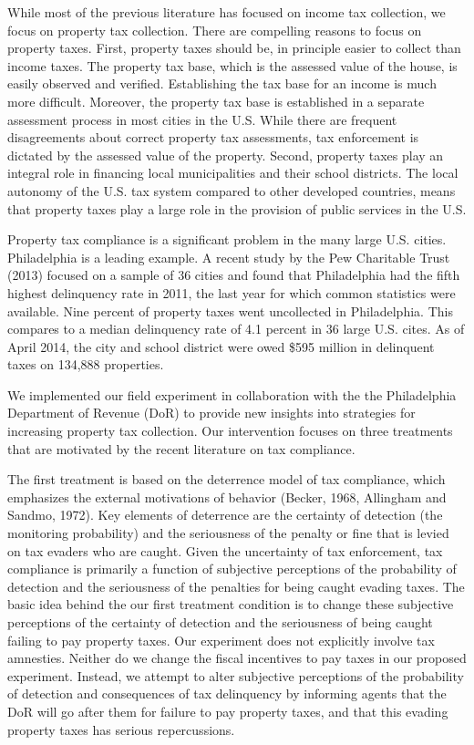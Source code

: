 \documentclass[12pt,titlepage]{article}
\begin{document}
While most of the previous literature has focused on income tax
collection, we focus on property tax collection.  There are compelling reasons to
focus on property taxes.  First, property taxes should be,
in principle easier to collect than income taxes. The property tax
base, which is the assessed value of the house, is easily observed and
verified. Establishing the tax base for an income is much more difficult. 
Moreover, the property tax base is established
in a separate assessment process in most cities in the U.S. While
there are frequent disagreements about correct property tax
assessments, tax enforcement is dictated by the assessed value of the property.
Second, property taxes play an integral role in financing local municipalities and 
their school districts.  The local autonomy of the U.S. tax system compared to other 
developed countries, means that property taxes play a large role in the provision
of public services in the U.S.  

Property tax compliance is a significant problem in the many
large U.S. cities. Philadelphia is a leading example.  A recent study by the
Pew Charitable Trust (2013) focused on a sample of 36 cities and found
that Philadelphia had the fifth highest delinquency rate in 2011, the
last year for which common statistics were available. Nine percent of 
property taxes went uncollected in Philadelphia.  This compares to 
a median delinquency rate of 4.1 percent in 36 large U.S. cites.  
As of April 2014, the city and school district were owed
\$595 million in delinquent taxes on 134,888 properties.  

We implemented our field experiment in collaboration with the the Philadelphia Department of Revenue (DoR)
to provide new insights into strategies for increasing property tax collection. Our intervention
focuses on three treatments that are motivated by the recent literature on tax
compliance.  

The first treatment is based on the deterrence model of
tax compliance, which emphasizes the external motivations of behavior
(Becker, 1968, Allingham and Sandmo, 1972). Key elements of deterrence are the
certainty of detection (the monitoring probability) and the seriousness of
the penalty or fine that is levied on tax evaders who are caught. 
Given the uncertainty of tax enforcement, tax compliance is primarily 
a function of subjective perceptions of the probability of detection and the seriousness
of the penalties for being caught evading taxes. The basic idea behind the our first treatment 
condition is to change these subjective perceptions of the certainty of detection and the seriousness 
of being caught failing to pay property taxes. Our experiment does not explicitly involve tax amnesties. 
Neither do we change the fiscal incentives to pay taxes in our proposed experiment. 
Instead, we attempt to alter subjective perceptions of the probability of detection and consequences of tax
delinquency by informing agents that the DoR will go after them for failure to pay property taxes, and that
this evading property taxes has serious repercussions.
\end{document}
